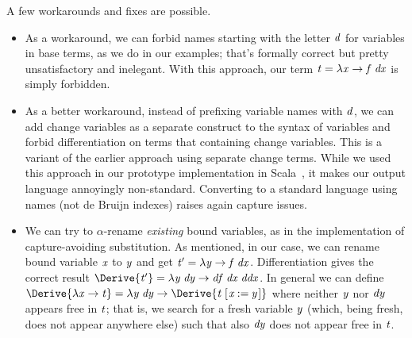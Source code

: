 A few workarounds and fixes are possible.
\begin{itemize}
\item As a workaround, we can forbid names starting with the letter \ensuremath{\Varid{d}} for
  variables in base terms, as we do in our examples; that's
  formally correct but pretty unsatisfactory and inelegant. With
  this approach, our term \ensuremath{\Varid{t}\mathrel{=}\lambda \Varid{x}\to \Varid{f}\;\Varid{dx}} is simply forbidden.
\item As a better workaround, instead of prefixing variable names
  with \ensuremath{\Varid{d}}, we can add change variables as a separate construct
  to the syntax of variables and forbid differentiation on terms
  that containing change variables. This is a variant of the earlier approach
  using separate change terms.
  While we used this approach
  in our prototype implementation in
  Scala~\citep{CaiEtAl2014ILC}, it makes our output language
  annoyingly non-standard. Converting to a standard language using names (not
  de Bruijn indexes) raises again capture issues.



\item We can try to $\alpha$-rename \emph{existing} bound
  variables, as in the implementation of capture-avoiding
  substitution. As mentioned, in our case, we can rename bound
  variable \ensuremath{\Varid{x}} to \ensuremath{\Varid{y}} and get \ensuremath{\Varid{t'}\mathrel{=}\lambda \Varid{y}\to \Varid{f}\;\Varid{dx}}. Differentiation
  gives the correct result \ensuremath{\Derive{\Varid{t'}}\mathrel{=}\lambda \Varid{y}\;\Varid{dy}\to \Varid{df}\;\Varid{dx}\;\Varid{ddx}}. In
  general we can define \ensuremath{\Derive{\lambda \Varid{x}\to \Varid{t}}\mathrel{=}\lambda \Varid{y}\;\Varid{dy}\to \Derive{\Varid{t}\;[\mskip1.5mu \Varid{x}\mathbin{:=}\Varid{y}\mskip1.5mu]}} where neither \ensuremath{\Varid{y}} nor \ensuremath{\Varid{dy}} appears free in \ensuremath{\Varid{t}}; that is,
  we search for a fresh variable \ensuremath{\Varid{y}} (which, being fresh, does
  not appear anywhere else) such that also \ensuremath{\Varid{dy}} does not appear
  free in \ensuremath{\Varid{t}}.


\end{itemize}
